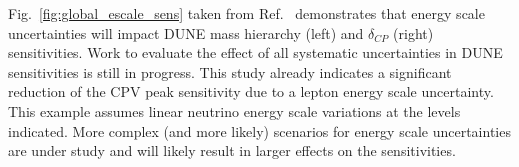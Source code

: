  Fig.~\ref{fig:global_escale_sens} taken from Ref.~\cite{dunecdr} demonstrates that
energy scale uncertainties will impact DUNE 
mass hierarchy (left) and $\delta_{CP}$ (right) sensitivities.
Work to evaluate the effect of all systematic uncertainties in DUNE sensitivities is still in progress.
This study already indicates a significant reduction of the CPV peak sensitivity due to a lepton energy scale uncertainty. 
This example assumes linear neutrino energy scale variations at the levels indicated.
More complex (and more likely) scenarios for energy scale uncertainties are under study and
will likely result in larger effects on the sensitivities.
